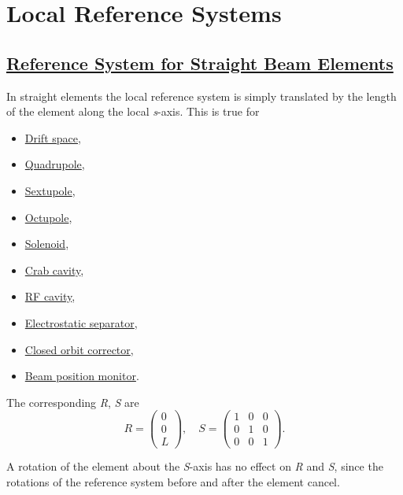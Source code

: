 
\section{Local Reference Systems}

\subsection{\href{straight}{Reference System for Straight Beam
    Elements}} 
In straight elements the local reference system is simply translated by
the length of the element along the local \textit{s}-axis. This is true
for  
\begin{itemize}
   \item \href{drift.html}{Drift space}, 
   \item \href{quadrupole.html}{Quadrupole}, 
   \item \href{sextupole.html}{Sextupole}, 
   \item \href{octupole.html}{Octupole}, 
   \item \href{solenoid.html}{Solenoid}, 
   \item \href{crabcavity.html}{Crab cavity}, 
   \item \href{cavity.html}{RF cavity}, 
   \item \href{separator.html}{Electrostatic separator}, 
   \item \href{kickers.html}{Closed orbit corrector}, 
   \item \href{monitors.html}{Beam position monitor}. 
\end{itemize} 

The corresponding \textit{R}, \textit{S} are 
\[
R =
 \begin{pmatrix}
  0 \\
  0 \\
  L
 \end{pmatrix}
, \quad
S =
 \begin{pmatrix}
  1 & 0 &  0 \\
  0 & 1 &  0 \\
  0 & 0 &  1
 \end{pmatrix}
.
\]

A rotation of the element about the \textit{S}-axis has no effect on
\textit{R} and \textit{S}, since the rotations of the reference system
before and after the element cancel.  

